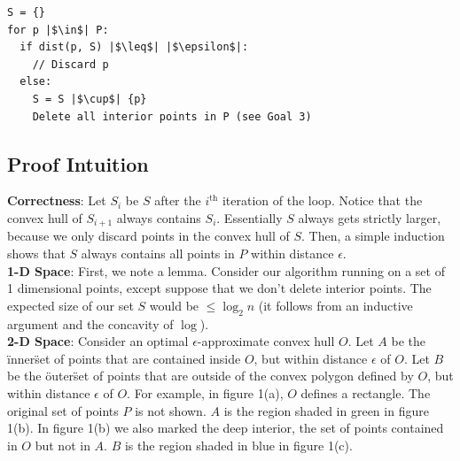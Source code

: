 \documentclass[12pt]{article}
\theoremstyle{definition}
\begin{document}
\begin{lstlisting}[escapechar=|]
S = {}
for p |$\in$| P:
  if dist(p, S) |$\leq$| |$\epsilon$|:
    // Discard p
  else:
    S = S |$\cup$| {p}
    Delete all interior points in P (see Goal 3)
\end{lstlisting}

\subsection{Proof Intuition}

\textbf{Correctness}: Let $S_i$ be $S$ after the $i^{\mbox{th}}$ iteration of the loop. Notice that the convex hull of $S_{i+1}$ always contains $S_i$. Essentially $S$ always gets strictly larger, because we only discard points in the convex hull of $S$. Then, a simple induction shows that $S$ always contains all points in $P$ within distance $\epsilon$.
\\

\noindent \textbf{1-D Space}: First, we note a lemma. Consider our algorithm running on a set of 1 dimensional points, except suppose that we don't delete interior points. The expected size of our set $S$ would be $\leq \log_2{n}$ (it follows from an inductive argument and the concavity of $\log$). 
\\

\noindent \textbf{2-D Space}: Consider an optimal $\epsilon$-approximate convex hull $O$. Let $A$ be the \"inner\" set of points that are contained inside $O$, but within distance $\epsilon$ of $O$. Let $B$ be the \"outer\" set of points that are outside of the convex polygon defined by $O$, but within distance $\epsilon$ of $O$. For example, in figure 1(a), $O$ defines a rectangle. The original set of points $P$ is not shown. $A$ is the region shaded in green in figure 1(b). In figure 1(b) we also marked the deep interior, the set of points contained in $O$ but not in $A$. $B$ is the region shaded in blue in figure 1(c). 
\\
\end{document}
